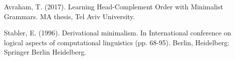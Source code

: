 \documentclass{article}
\begin{document}

\clearpage
\fancyhead{} %

\begin{thebibliography}{} %

Avraham, T. (2017). 
Learning Head-Complement Order with Minimalist Grammars.
MA thesis, Tel Aviv University.


Stabler, E. (1996). 
Derivational minimalism. In International conference on logical aspects of computational linguistics (pp. 68-95). 
Berlin, Heidelberg: Springer Berlin Heidelberg.


\end{thebibliography}
\end{document}
